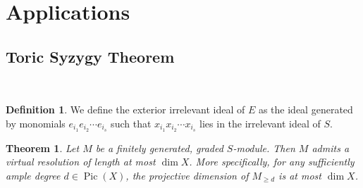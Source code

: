 \documentclass[12pt]{amsart}
\newtheorem{thm}[lemma]{Theorem}
\theoremstyle{definition}
\newtheorem{defn}[lemma]{Definition}
\theoremstyle{remark}
\newcommand{\Pic}{\operatorname{Pic}}
\newcommand{\defi}[1]{\textsf{#1}} %
\newcommand{\daniel}[1]{{\color{blue} \sf $\clubsuit\clubsuit\clubsuit$ Daniel: [#1]}}
\begin{document}
\section{Applications}

\subsection{Toric Syzygy Theorem}

\

\begin{defn}
We define the \defi{exterior irrelevant ideal} of $E$ as the ideal generated by monomials $e_{i_1}e_{i_2}\cdots e_{i_s}$ such that $x_{i_1}x_{i_2}\cdots x_{i_s}$ lies in the irrelevant ideal of $S$.
\end{defn}
\begin{thm}
Let $M$ be a finitely generated, graded $S$-module.  Then $M$ admits a virtual resolution of length at most $\dim X$.  More specifically, for any sufficiently ample degree $d\in \Pic(X)$, the projective dimension of $M_{\geq d}$ is at most $\dim X$.
\end{thm}
\end{document}

